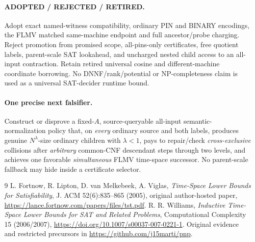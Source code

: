 \documentclass[11pt]{article}
\begin{document}
\paragraph{ADOPTED / REJECTED / RETIRED.}
Adopt exact named-witness compatibility, ordinary PIN and
BINARY encodings, the FLMV matched same-machine endpoint and
full ancestor/probe charging. Reject promotion from promised
scope, all-pins-only certificates, free quotient labels,
parent-scale SAT lookahead, and uncharged nested child access
to an all-input contraction. Retain retired universal cosine
and different-machine coordinate borrowing.
No DNNF/rank/potential or NP-completeness claim is used as a
universal SAT-decider runtime bound.

\paragraph{One precise next falsifier.}
Construct or disprove a fixed-$A$, source-queryable all-input
semantic-normalization policy that, on \emph{every} ordinary
source and both labels, produces genuine $N^\lambda$-size
ordinary children with $\lambda<1$, pays to repair/check
\emph{cross-exclusive} collisions after \emph{arbitrary}
common-CNF descendant steps through two levels, and achieves
one favorable \emph{simultaneous} FLMV time-space successor.
No parent-scale fallback may hide inside a certificate selector.

\begin{thebibliography}{9}
 L. Fortnow, R. Lipton, D. van Melkebeek, A. Viglas,
\emph{Time-Space Lower Bounds for Satisfiability},
J. ACM 52(6):835--865 (2005), original author-hosted paper,
\url{https://lance.fortnow.com/papers/files/tst.pdf}.
 R. R. Williams,
\emph{Inductive Time-Space Lower Bounds for SAT and Related Problems},
Computational Complexity 15 (2006/2007),
\url{https://doi.org/10.1007/s00037-007-0221-1}.
 Original evidence and restricted precursors in
\url{https://github.com/j15marti/pnp}.
\end{thebibliography}
\end{document}
